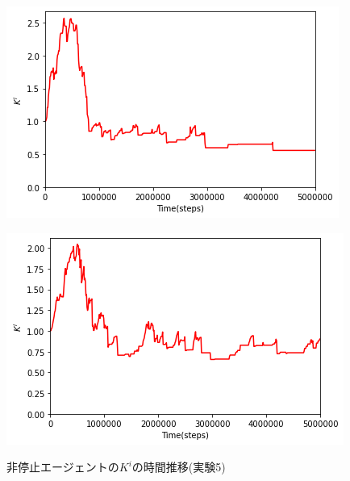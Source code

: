 \documentclass[12pt,a4j,twoside]{jarticle}
\begin{document}
\begin{figure}
\begin{minipage}{0.48\hsize}
      \includegraphics[width=0.99\hsize]{figures/CorrectionTransition_CountStop_2.png}
      \label{subfig:transition_count_2}
    \end{minipage}
    \hfill
    \begin{minipage}{0.48\hsize}
      \centering
      \includegraphics[width=0.99\hsize]{figures/CorrectionTransition_CountStop_9.png}
      \label{subfig:transition_count_9}
    \end{minipage}
    \caption{非停止エージェントの$K^i$の時間推移(実験5)}
    \label{fig:transition_notSuspend_count}
  \end{figure}
\end{document}
